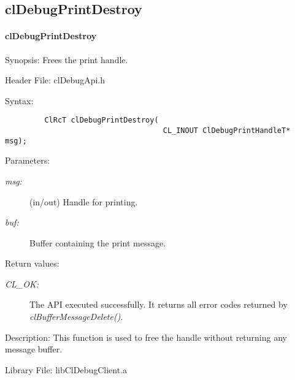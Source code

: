 \subsection{clDebugPrintDestroy}
\hypertarget{pageDbg109}{}\paragraph{cl\-Debug\-Print\-Destroy}\label{pageDbg109}
\begin{Desc}
\item[Synopsis:]Frees the print handle.\end{Desc}
\begin{Desc}
\item[Header File:]clDebugApi.h\end{Desc}
\begin{Desc}
\item[Syntax:]

\footnotesize\begin{verbatim}         ClRcT clDebugPrintDestroy(
                          			CL_INOUT ClDebugPrintHandleT* msg);
\end{verbatim}
\normalsize
\end{Desc}
\begin{Desc}
\item[Parameters:]
\begin{description}
\item[{\em msg:}](in/out) Handle for printing. \item[{\em buf:}]Buffer containing the print message.\end{description}
\end{Desc}
\begin{Desc}
\item[Return values:]
\begin{description}
\item[{\em CL\_\-OK:}]The API executed successfully. It returns all error codes returned by 
\textit{clBufferMessageDelete()}.\end{description}
\end{Desc}
\begin{Desc}
\item[Description:]This function is used to free the handle without returning any message buffer.\end{Desc}
\begin{Desc}
\item[Library File:]lib\-Cl\-Debug\-Client.a\end{Desc}
